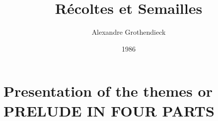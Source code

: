 \documentclass{book}
\begin{document}
\title{R\'ecoltes et Semailles}
\author{Alexandre Grothendieck}
\date{1986}
\maketitle
\tableofcontents

\part*{Presentation of the themes or PRELUDE IN FOUR PARTS}




\end{document}
